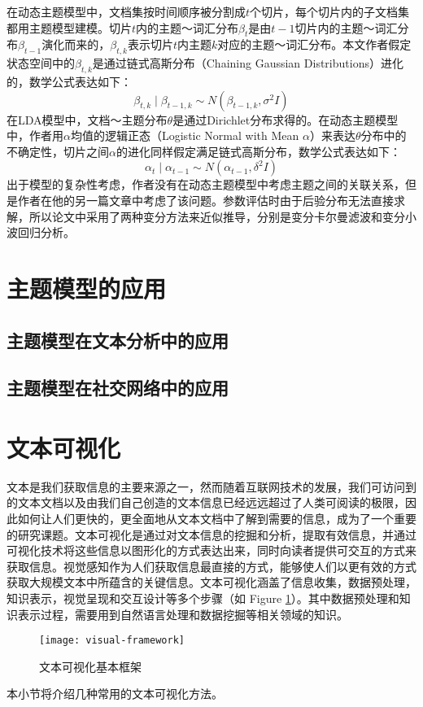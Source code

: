 在动态主题模型中，文档集按时间顺序被分割成$t$个切片，每个切片内的子文档集都用主题模型建模。切片$t$内的主题～词汇分布$\beta_t$是由$t-1$切片内的主题～词汇分布$\beta_{t-1}$演化而来的，$\beta_{t,k}$表示切片$t$内主题$k$对应的主题～词汇分布。本文作者假定状态空间中的$\beta_{t,k}$是通过链式高斯分布（Chaining Gaussian Distributions）进化的，数学公式表达如下：
$$
\beta_{t,k} \mid \beta_{t-1,k} \sim N \left( \beta_{t-1,k}, \sigma^2 I \right)
$$
在LDA模型中，文档～主题分布$\theta$是通过Dirichlet分布求得的。在动态主题模型中，作者用$\alpha$均值的逻辑正态（Logistic Normal with Mean $\alpha$）来表达$\theta$分布中的不确定性，切片之间$\alpha$的进化同样假定满足链式高斯分布，数学公式表达如下：
$$
\alpha_t \mid \alpha_{t-1} \sim N \left( \alpha_{t-1}, \delta ^2 I \right)
$$
出于模型的复杂性考虑，作者没有在动态主题模型中考虑主题之间的关联关系，但是作者在他的另一篇文章\cite{lafferty2005correlated}中考虑了该问题。参数评估时由于后验分布无法直接求解，所以论文中采用了两种变分方法来近似推导，分别是变分卡尔曼滤波和变分小波回归分析。

\section{主题模型的应用}

\subsection{主题模型在文本分析中的应用}
\subsection{主题模型在社交网络中的应用}

\section{文本可视化}
文本是我们获取信息的主要来源之一，然而随着互联网技术的发展，我们可访问到的文本文档以及由我们自己创造的文本信息已经远远超过了人类可阅读的极限，因此如何让人们更快的，更全面地从文本文档中了解到需要的信息，成为了一个重要的研究课题。文本可视化是通过对文本信息的挖掘和分析，提取有效信息，并通过可视化技术将这些信息以图形化的方式表达出来，同时向读者提供可交互的方式来获取信息。视觉感知作为人们获取信息最直接的方式，能够使人们以更有效的方式获取大规模文本中所蕴含的关键信息。文本可视化涵盖了信息收集，数据预处理，知识表示，视觉呈现和交互设计等多个步骤（如 Figure \ref{fig:visual-framework}）。其中数据预处理和知识表示过程，需要用到自然语言处理和数据挖掘等相关领域的知识。
\begin{figure}[!htb]
	\centering
		\texttt{[image: visual-framework]}
	\caption{文本可视化基本框架}
	\label{fig:visual-framework}
\end{figure}
本小节将介绍几种常用的文本可视化方法。

